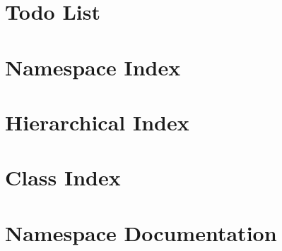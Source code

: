 \documentclass[twoside]{book}
\newcommand{\+}{\discretionary{\mbox{\scriptsize$\hookleftarrow$}}{}{}}
\begin{document}
\chapter{Todo List}
\label{todo}
\hypertarget{todo}{}

\chapter{Namespace Index}

\chapter{Hierarchical Index}

\chapter{Class Index}

\chapter{Namespace Documentation}





\end{document}
